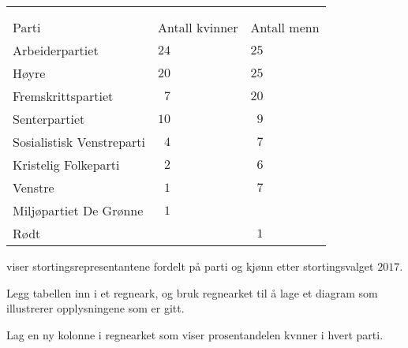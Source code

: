 


\Oppgave[4] %

\begin{table}[H]
    \centering
    \edef\tableTitle{}
    \begin{tabu} to \textwidth {| X[2] | Y | Y |}
    \hline
     \\
     \\ \hline
    \Rowcolor
        Parti                     & Antall kvinner & Antall menn \\ \hline
        Arbeiderpartiet           &           $24$ &           $25$ \\
        Høyre                     &           $20$ &           $25$ \\
        Fremskrittspartiet        & $\phantom{1}7$ &           $20$ \\
        Senterpartiet             &           $10$ & $\phantom{1}9$ \\
        Sosialistisk Venstreparti & $\phantom{1}4$ & $\phantom{2}7$ \\
        Kristelig Folkeparti      & $\phantom{1}2$ & $\phantom{2}6$ \\
        Venstre                   & $\phantom{1}1$ & $\phantom{2}7$ \\
        Miljøpartiet De Grønne    & $\phantom{1}1$ &                \\
        Rødt                      &                & $\phantom{2}1$ \\
    \hline
    \end{tabu}
    \caption{}
    \label{tab:del-1-oppgave-2.1}
\end{table}

 viser stortingsrepresentantene fordelt på parti og
kjønn etter stortingsvalget $2017$.

\begin{oppgaver}
     Legg tabellen inn i et regneark, og bruk regnearket til å lage et
    diagram som illustrerer opplysningene som er gitt.
\end{oppgaver}

\begin{oppgaver}
     Lag en ny kolonne i regnearket som viser prosentandelen kvnner i
    hvert parti.
\end{oppgaver}


